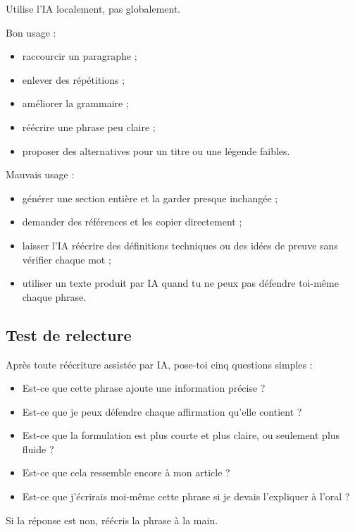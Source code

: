 \documentclass[11pt,a4paper]{article}
\theoremstyle{definition}
\begin{document}
Utilise l'IA localement, pas globalement.

Bon usage :
\begin{itemize}
    \item raccourcir un paragraphe ;
    \item enlever des répétitions ;
    \item améliorer la grammaire ;
    \item réécrire une phrase peu claire ;
    \item proposer des alternatives pour un titre ou une légende faibles.
\end{itemize}

Mauvais usage :
\begin{itemize}
    \item générer une section entière et la garder presque inchangée ;
    \item demander des références et les copier directement ;
    \item laisser l'IA réécrire des définitions techniques ou des idées de preuve sans vérifier chaque mot ;
    \item utiliser un texte produit par IA quand tu ne peux pas défendre toi-même chaque phrase.
\end{itemize}

\subsection*{Test de relecture}

Après toute réécriture assistée par IA, pose-toi cinq questions simples :
\begin{itemize}
    \item Est-ce que cette phrase ajoute une information précise ?
    \item Est-ce que je peux défendre chaque affirmation qu'elle contient ?
    \item Est-ce que la formulation est plus courte et plus claire, ou seulement plus fluide ?
    \item Est-ce que cela ressemble encore à mon article ?
    \item Est-ce que j'écrirais moi-même cette phrase si je devais l'expliquer à l'oral ?
\end{itemize}

Si la réponse est non, réécris la phrase à la main.
\end{document}
